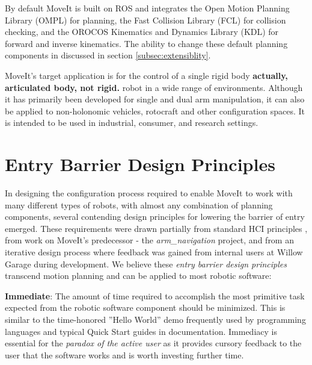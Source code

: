 \documentclass[10pt,journal,compsoc]{joser1}
\begin{document}
{By default MoveIt is built on ROS and integrates the Open Motion Planning Library (OMPL) \cite{sucan2012the-open-motion-planning-library} for planning, the Fast Collision Library (FCL) \cite{fcl} for collision checking, and the OROCOS Kinematics and Dynamics Library (KDL) \cite{kdl} for forward and inverse kinematics. The ability to change these default planning components in discussed in section \ref{subsec:extensiblity}.

MoveIt's target application is for the control of a single rigid body \textbf{actually, articulated body, not rigid.} robot in a wide range of environments. Although it has primarily been developed for single and dual arm manipulation, it can also be applied to non-holonomic vehicles, rotocraft and other configuration spaces. It is intended to be used in industrial, consumer, and research settings. 

\section{Entry Barrier Design Principles}
\label{sec::requirements}

In designing the configuration process required to enable MoveIt to work with many different types of robots, with almost any combination of planning components, several contending design principles for lowering the barrier of entry emerged. These requirements were drawn partially from standard HCI principles \cite{galitz2007essential}, from work on MoveIt's predecessor - the \textit{arm\_navigation} project, and from an iterative design process where feedback was gained from internal users at Willow Garage during development. We believe these \textit{entry barrier design principles} transcend motion planning and can be applied to most robotic software:

{\bf Immediate}: The amount of time required to accomplish the most primitive task expected from the robotic software component should be minimized. This is similar to the time-honored ''Hello World'' demo frequently used by programming languages and typical Quick Start guides in documentation. Immediacy is essential for the \textit{paradox of the active user} as it provides cursory feedback to the user that the software works and is worth investing further time.

}
\end{document}
